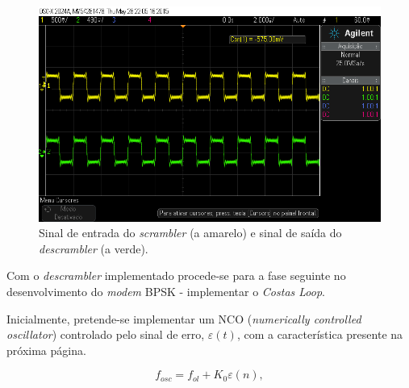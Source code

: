 \documentclass[11pt]{article}
\numberwithin{equation}{section}
\begin{document}
\begin{figure}[H]
	\centering
	\includegraphics[keepaspectratio=true, scale=0.37]{exps/DescramblerBnVsBnlinha}
	\caption{Sinal de entrada do \textit{scrambler} (a amarelo) e sinal de saída do \textit{descrambler} (a verde).}
	\vspace{-0.8em}
\end{figure}

Com o \textit{descrambler} implementado procede-se para a fase seguinte no desenvolvimento do \textit{modem} BPSK - implementar o \textit{Costas Loop}. 

Inicialmente, pretende-se implementar um NCO (\textit{numerically controlled oscillator}) controlado pelo sinal de erro, $\varepsilon (t)$, com a característica presente na próxima página.

\vspace{-3mm}
\begin{equation}
	f_{osc} = f_{ol} + K_0\varepsilon (n), 
\end{equation} 
\end{document}
